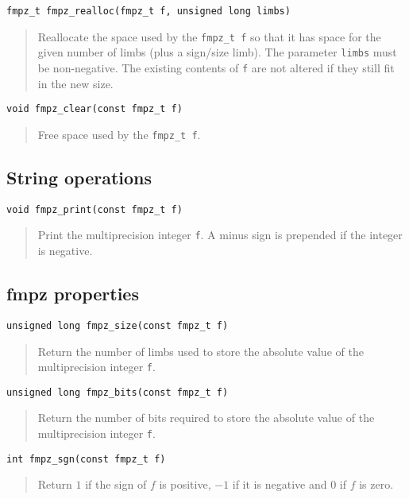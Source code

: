 \documentclass[a4paper,10pt]{article}
\newcommand{\code}{\lstinline}
\begin{document}
\begin{lstlisting}
fmpz_t fmpz_realloc(fmpz_t f, unsigned long limbs)
\end{lstlisting}
\begin{quote}
Reallocate the space used by the \code{fmpz_t f} so that it has space for the given number of limbs (plus a sign/size limb). The parameter \code{limbs} must be non-negative. The existing contents of \code{f} are not altered if they still fit in the new size.
\end{quote}

\begin{lstlisting}
void fmpz_clear(const fmpz_t f)
\end{lstlisting}
\begin{quote}
Free space used by the \code{fmpz_t f}.
\end{quote}

\subsection{String operations}

\begin{lstlisting}
void fmpz_print(const fmpz_t f)
\end{lstlisting}
\begin{quote}
Print the multiprecision integer \code{f}. A minus sign is prepended if the integer is negative.
\end{quote}

\subsection{fmpz properties}

\begin{lstlisting}
unsigned long fmpz_size(const fmpz_t f)
\end{lstlisting}
\begin{quote}
Return the number of limbs used to store the absolute value of the multiprecision integer \code{f}.
\end{quote}

\begin{lstlisting}
unsigned long fmpz_bits(const fmpz_t f)
\end{lstlisting}
\begin{quote}
Return the number of bits required to store the absolute value of the multiprecision integer \code{f}.
\end{quote}

\begin{lstlisting}
int fmpz_sgn(const fmpz_t f)
\end{lstlisting}
\begin{quote}
Return $1$ if the sign of $f$ is positive, $-1$ if it is negative and $0$ if $f$ is zero. 
\end{quote}
\end{document}
